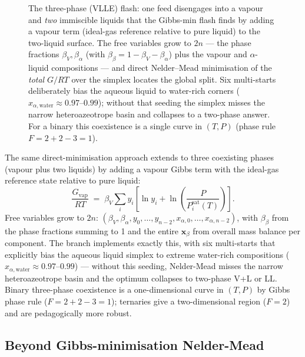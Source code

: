 \documentclass[11pt,a4paper]{article}
\begin{document}
\begin{figure}[ht]
\caption{The three-phase (VLLE) flash: one feed disengages into a vapour
and \emph{two} immiscible liquids that the Gibbs-min flash finds by
adding a vapour term (ideal-gas reference relative to pure liquid) to the
two-liquid surface.  The free variables grow to $2n$ --- the phase
fractions $\beta_V,\beta_\alpha$ (with $\beta_\beta=1-\beta_V-\beta_\alpha$)
plus the vapour and $\alpha$-liquid compositions --- and direct
Nelder--Mead minimisation of the \emph{total} $G/RT$ over the simplex
locates the global split.  Six multi-starts deliberately bias the
aqueous liquid to water-rich corners ($x_{\alpha,\mathrm{water}}\approx
0.97$--$0.99$); without that seeding the simplex misses the narrow
heteroazeotrope basin and collapses to a two-phase answer.  For a binary
this coexistence is a single curve in $(T,P)$ (phase rule
$F=2+2-3=1$).}
\label{fig:vlle-split}
\end{figure}


The same direct-minimisation approach extends to three coexisting
phases (vapour plus two liquids) by adding a vapour Gibbs term with
the ideal-gas reference state relative to pure liquid:
\[
    \frac{G_{\mathrm{vap}}}{RT}
    \;=\; \beta_V \sum_i y_i
    \left[\ln y_i + \ln\!\left(\frac{P}{P_i^{\mathrm{sat}}(T)}\right)\right].
\]
Free variables grow to $2n$: $(\beta_V, \beta_\alpha, y_0, \ldots,
y_{n-2}, x_{\alpha,0}, \ldots, x_{\alpha,n-2})$, with $\beta_\beta$
from the phase fractions summing to 1 and the entire $\mathbf
x_\beta$ from overall mass balance per component.  The
 branch implements exactly
this, with six multi-starts that explicitly bias the aqueous
liquid simplex to extreme water-rich compositions ($x_{\alpha,
\mathrm{water}} \approx 0.97$--$0.99$) --- without this seeding,
Nelder-Mead misses the narrow heteroazeotrope basin and the
optimum collapses to two-phase V+L or LL.  Binary three-phase
coexistence is a one-dimensional curve in $(T, P)$ by Gibbs phase
rule ($F = 2 + 2 - 3 = 1$); ternaries give a two-dimensional region
($F = 2$) and are pedagogically more robust.

\subsection*{Beyond Gibbs-minimisation Nelder-Mead}
\end{document}
